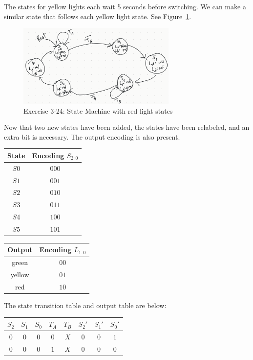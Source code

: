 \documentclass[12pt]{article}
\newenvironment{sol}[1][Solution]{\begin{trivlist}
		\item[\hskip \labelsep {\bfseries #1:}]}{\end{trivlist}}
\begin{document}
\begin{sol}
	The states for yellow lights each wait 5 seconds before switching. We can make a similar state that follows each yellow light state. See Figure~\ref{03-24-state-machine}.
	\begin{figure}
		\centering
		\includegraphics[width=0.7\textwidth]{03-24-state-machine}
		\caption{Exercise 3-24: State Machine with red light states}
		\label{03-24-state-machine}
	\end{figure}
	Now that two new states have been added, the states have been relabeled, and an extra bit is necessary. The output encoding is also present.
	\begin{center}
		\begin{tabular}{c|c}
			State & Encoding $S_{2:0}$ \\
			\hline
			$S0$ & $000$\\
			$S1$ & $001$\\
			$S2$ & $010$\\
			$S3$ & $011$\\
			$S4$ & $100$\\
			$S5$ & $101$\\
		\end{tabular}
		\quad
		\begin{tabular}{c|c}
			Output & Encoding $L_{1:0}$\\
			\hline
			green & $00$\\
			yellow & $01$\\
			red & $10$\\
		\end{tabular}
	\end{center}
	The state transition table and output table are below:
	\begin{center}
		\begin{tabular}{ccc|cc|ccc}
			$S_2$ & $S_1$ & $S_0$ & $T_A$ & $T_B$ & $S_{2}'$ & $S_{1}'$ & $S_0'$\\
			\hline
			$0$ & $0$ & $0$ & $0$ & $X$ & $0$ & $0$ & $1$\\
			$0$ & $0$ & $0$ & $1$ & $X$ & $0$ & $0$ & $0$\\

\end{tabular}
\end{center}
\end{sol}
\end{document}
